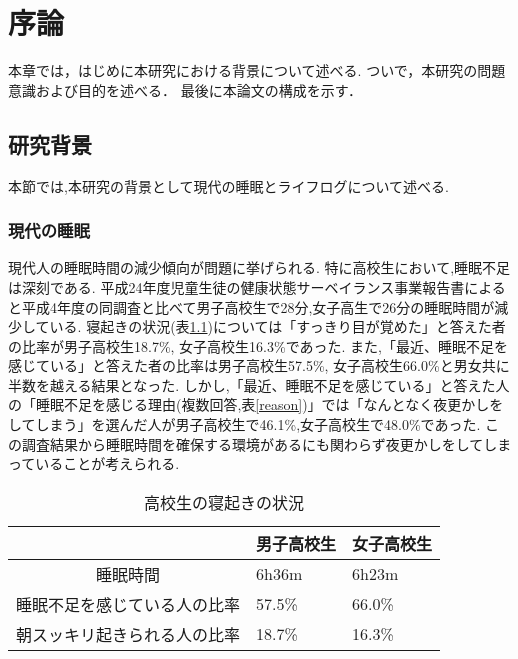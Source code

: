 \chapter{序論}
本章では，はじめに本研究における背景について述べる.
ついで，本研究の問題意識および目的を述べる．
最後に本論文の構成を示す．

\section{研究背景}
本節では,本研究の背景として現代の睡眠とライフログについて述べる.

\subsection{現代の睡眠}
現代人の睡眠時間の減少傾向が問題に挙げられる. 
特に高校生において,睡眠不足は深刻である.
平成24年度児童生徒の健康状態サーベイランス事業報告書\cite{Survey24}によると平成4年度の同調査と比べて男子高校生で28分,女子高生で26分の睡眠時間が減少している. 
寝起きの状況(表\ref{sleepmotivation})については「すっきり目が覚めた」と答えた者の比率が男子高校生18.7\%, 女子高校生16.3\%であった.
また,「最近、睡眠不足を感じている」と答えた者の比率は男子高校生57.5\%, 女子高校生66.0\%と男女共に半数を越える結果となった.
しかし,「最近、睡眠不足を感じている」と答えた人の「睡眠不足を感じる理由(複数回答,表\ref{reason})」では「なんとなく夜更かしをしてしまう」を選んだ人が男子高校生で46.1\%,女子高校生で48.0\%であった.
この調査結果から睡眠時間を確保する環境があるにも関わらず夜更かしをしてしまっていることが考えられる. 

\begin{table}[htbp]
	\begin{center}
		\caption{高校生の寝起きの状況}
		\label{sleepmotivation}
		\begin{tabular}{|c|ll|}
		\hline
		 & 男子高校生 & 女子高校生\\
		\hline \hline
		睡眠時間 & 6h36m & 6h23m \\
		睡眠不足を感じている人の比率 & 57.5\% & 66.0\% \\
		朝スッキリ起きられる人の比率 & 18.7\% & 16.3\% \\
		\hline
		\end{tabular}
	\end{center}
\end{table}

